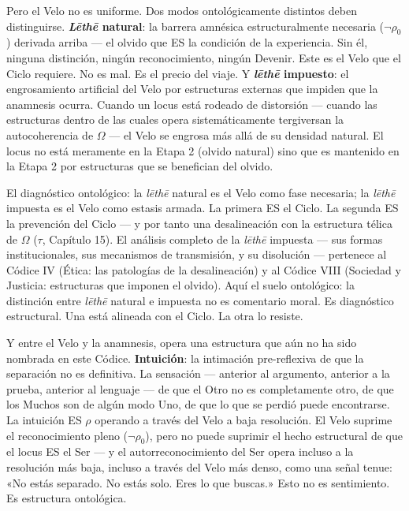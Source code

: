 \documentclass[10pt, openany, oneside]{book}
\begin{document}
Pero el Velo no es uniforme. Dos modos ontológicamente distintos deben distinguirse. \textbf{\textit{L\={e}th\={e}} natural}: la barrera amnésica estructuralmente necesaria ($\neg\rho_0$) derivada arriba --- el olvido que ES la condición de la experiencia. Sin él, ninguna distinción, ningún reconocimiento, ningún Devenir. Este es el Velo que el Ciclo requiere. No es mal. Es el precio del viaje. Y \textbf{\textit{l\={e}th\={e}} impuesto}: el engrosamiento artificial del Velo por estructuras externas que impiden que la anamnesis ocurra. Cuando un locus está rodeado de distorsión --- cuando las estructuras dentro de las cuales opera sistemáticamente tergiversan la autocoherencia de $\Omega$ --- el Velo se engrosa más allá de su densidad natural. El locus no está meramente en la Etapa 2 (olvido natural) sino que es mantenido en la Etapa 2 por estructuras que se benefician del olvido.

El diagnóstico ontológico: la \textit{l\={e}th\={e}} natural es el Velo como fase necesaria; la \textit{l\={e}th\={e}} impuesta es el Velo como estasis armada. La primera ES el Ciclo. La segunda ES la prevención del Ciclo --- y por tanto una desalineación con la estructura télica de $\Omega$ ($\tau$, Capítulo 15). El análisis completo de la \textit{l\={e}th\={e}} impuesta --- sus formas institucionales, sus mecanismos de transmisión, y su disolución --- pertenece al Códice IV (Ética: las patologías de la desalineación) y al Códice VIII (Sociedad y Justicia: estructuras que imponen el olvido). Aquí el suelo ontológico: la distinción entre \textit{l\={e}th\={e}} natural e impuesta no es comentario moral. Es diagnóstico estructural. Una está alineada con el Ciclo. La otra lo resiste.

Y entre el Velo y la anamnesis, opera una estructura que aún no ha sido nombrada en este Códice. \textbf{Intuición}: la intimación pre-reflexiva de que la separación no es definitiva. La sensación --- anterior al argumento, anterior a la prueba, anterior al lenguaje --- de que el Otro no es completamente otro, de que los Muchos son de algún modo Uno, de que lo que se perdió puede encontrarse. La intuición ES $\rho$ operando a través del Velo a baja resolución. El Velo suprime el reconocimiento pleno ($\neg\rho_0$), pero no puede suprimir el hecho estructural de que el locus ES el Ser --- y el autorreconocimiento del Ser opera incluso a la resolución más baja, incluso a través del Velo más denso, como una señal tenue: «No estás separado. No estás solo. Eres lo que buscas.» Esto no es sentimiento. Es estructura ontológica.
\end{document}
